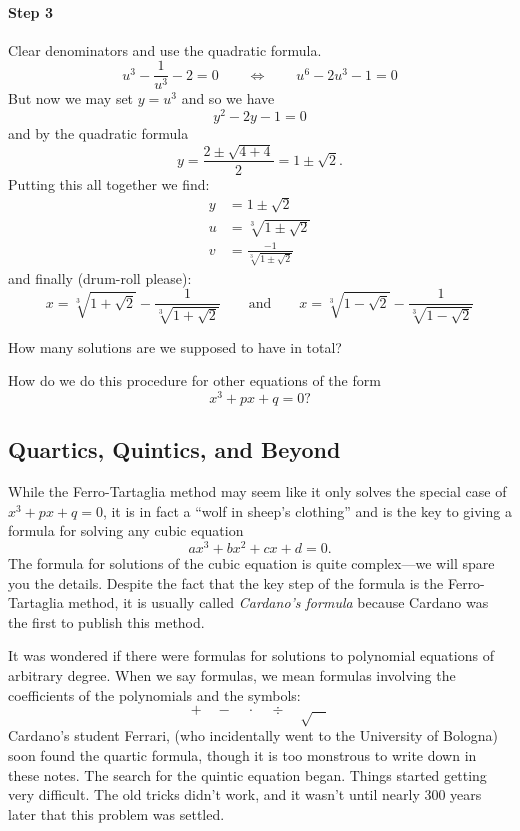 \paragraph{Step 3} 
Clear denominators and use the quadratic formula.
\[
u^3 - \frac{1}{u^3} -2 = 0 \qquad \Leftrightarrow \qquad u^6 - 2 u^3 -1 = 0
\]
But now we may set $y = u^3$ and so we have
\[
y^2 - 2y -1 = 0
\]
and by the quadratic formula
\[
y = \frac{2 \pm \sqrt{4 + 4}}{2} = 1 \pm \sqrt{2}.
\]
Putting this all together we find:
\begin{align*}
y &= 1 \pm \sqrt{2} \\
u &= \sqrt[3]{1 \pm \sqrt{2}}\\
v &= \frac{-1}{\sqrt[3]{1 \pm \sqrt{2}}}
\end{align*}
and finally (drum-roll please):
\[
x = \sqrt[3]{1 + \sqrt{2}} - \frac{1}{\sqrt[3]{1 + \sqrt{2}}} \qquad\text{and}\qquad x = \sqrt[3]{1 - \sqrt{2}} - \frac{1}{\sqrt[3]{1 - \sqrt{2}}}
\]

\begin{question} How many solutions are we supposed to have in total?
\end{question}
\QM


\begin{question} How do we do this procedure for other equations of the form
\[
x^3 + px + q = 0?
\]
\end{question}
\QM



\subsection{Quartics, Quintics, and Beyond}

While the Ferro-Tartaglia method may seem like it only solves the
special case of $x^3 + px +q = 0$, it is in fact a ``wolf in sheep's
clothing'' and is the key to giving a
formula for solving any cubic equation
\[
ax^3 + bx^2 + cx +d = 0.
\]
The formula for solutions of the cubic equation is quite complex---we
will spare you the details. Despite the fact that the key step of the
formula is the Ferro-Tartaglia method, it is usually called
\textit{Cardano's formula} because Cardano
was the first to publish this method.

It was wondered if there were formulas for solutions to polynomial
equations of arbitrary degree. When we say formulas, we mean formulas
involving the coefficients of the polynomials and the symbols:
\[
+\quad -\quad \cdot\quad \div \quad \sqrt{\hspace{1em}}
\]
Cardano's student Ferrari, (who incidentally went to the University of
Bologna) soon found the quartic formula, though it is too monstrous to
write down in these notes. The search for the quintic equation
began. Things started getting very difficult. The old tricks didn't
work, and it wasn't until nearly 300 years later that this problem was
settled.

